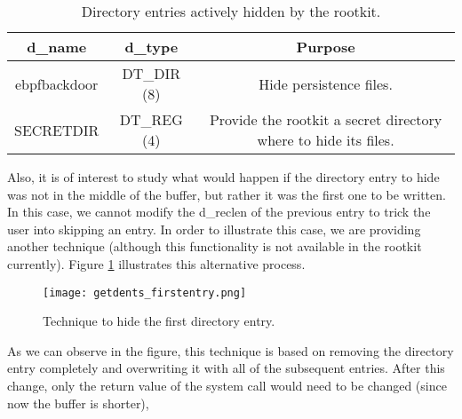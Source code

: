 \begin{table}[htbp]
\begin{tabular}{|c|c|c|}
\hline
\textbf{d\_name} & \textbf{d\_type} & \textbf{Purpose} \\
\hline
\hline
ebpfbackdoor & DT\_DIR (8) & Hide persistence files.\\
\hline
SECRETDIR & DT\_REG (4) & Provide the rootkit a secret directory where to hide its files.\\
\hline
\end{tabular}
\caption{Directory entries actively hidden by the rootkit.}
\label{table:dtype_dirent}
\end{table}

Also, it is of interest to study what would happen if the directory entry to hide was not in the middle of the buffer, but rather it was the first one to be written. In this case, we cannot modify the d\_reclen of the previous entry to trick the user into skipping an entry. In order to illustrate this case, we are providing another technique (although this functionality is not available in the rootkit currently). Figure \ref{fig:getdents_firstentry} illustrates this alternative process.

\begin{figure}[htbp]
	\centering
	\texttt{[image: getdents\_firstentry.png]}
	\caption{Technique to hide the first directory entry.}
	\label{fig:getdents_firstentry}
\end{figure}

As we can observe in the figure, this technique is based on removing the directory entry completely and overwriting it with all of the subsequent entries. After this change, only the return value of the system call would need to be changed (since now the buffer is shorter),

